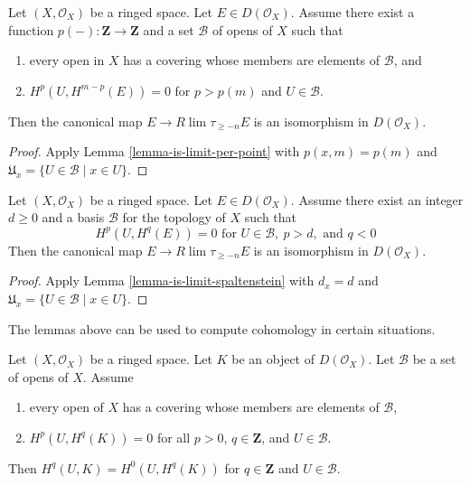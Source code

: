 \begin{lemma}
\label{lemma-is-limit}
Let $(X, \mathcal{O}_X)$ be a ringed space. Let $E \in D(\mathcal{O}_X)$.
Assume there exist a function $p(-) : \mathbf{Z} \to \mathbf{Z}$
and a set $\mathcal{B}$ of opens of $X$ such that
\begin{enumerate}
\item every open in $X$ has a covering whose members are
elements of $\mathcal{B}$, and
\item $H^p(U, H^{m - p}(E)) = 0$ for $p > p(m)$ and $U \in \mathcal{B}$.
\end{enumerate}
Then the canonical map $E \to R\lim \tau_{\geq -n} E$
is an isomorphism in $D(\mathcal{O}_X)$.
\end{lemma}

\begin{proof}
Apply Lemma \ref{lemma-is-limit-per-point}
with $p(x, m) = p(m)$ and
$\mathfrak{U}_x = \{U \in \mathcal{B} \mid x \in U\}$.
\end{proof}

\begin{lemma}
\label{lemma-is-limit-dimension}
Let $(X, \mathcal{O}_X)$ be a ringed space. Let $E \in D(\mathcal{O}_X)$.
Assume there exist an integer $d \geq 0$ and a basis $\mathcal{B}$ for the
topology of $X$ such that
$$
H^p(U, H^q(E)) = 0 \text{ for }
U \in \mathcal{B},\ p > d, \text{ and }q < 0
$$
Then the canonical map $E \to R\lim \tau_{\geq -n} E$
is an isomorphism in $D(\mathcal{O}_X)$.
\end{lemma}

\begin{proof}
Apply Lemma \ref{lemma-is-limit-spaltenstein} with $d_x = d$
and $\mathfrak{U}_x = \{U \in \mathcal{B} \mid x \in U\}$.
\end{proof}

\noindent
The lemmas above can be used to compute cohomology
in certain situations.

\begin{lemma}
\label{lemma-cohomology-over-U-trivial}
Let $(X, \mathcal{O}_X)$ be a ringed space. Let $K$
be an object of $D(\mathcal{O}_X)$.
Let $\mathcal{B}$ be a set of opens of $X$. Assume
\begin{enumerate}
\item every open of $X$ has a covering whose members are
elements of $\mathcal{B}$,
\item $H^p(U, H^q(K)) = 0$ for all $p > 0$, $q \in \mathbf{Z}$, and
$U \in \mathcal{B}$.
\end{enumerate}
Then $H^q(U, K) = H^0(U, H^q(K))$ for $q \in \mathbf{Z}$
and $U \in \mathcal{B}$.
\end{lemma}

